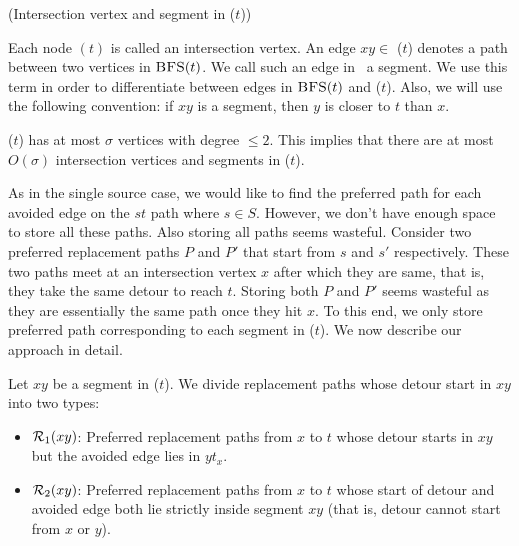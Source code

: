 \begin{definition} (Intersection vertex and segment in \SBFS($t$))

\noindent Each node  \SBFS$(t)$  is called an intersection vertex.
An edge $xy \in$ \SBFS($t$) denotes a path between two vertices in $\textsc{BFS}(t)$.
We call such an edge in \SBFS\  a segment. We use this term in order to differentiate between  edges in $\textsc{BFS}(t)$ and  \SBFS($t$).
Also, we will use the following convention: if $xy$ is a segment,
then $y$ is closer to $t$ than $x$.
\end{definition}
\noindent \SBFS($t$) has at most $\sigma$
vertices with degree $\le 2$. This implies that there are at most $O(\sigma)$
intersection vertices and segments in \SBFS($t$).

As in the single source case, we would like to find the preferred path for each avoided edge on the $st$
path where $s \in S$. However, we don't have enough space to store all these paths.
Also storing all  paths seems wasteful.
Consider two preferred replacement paths $P$ and $P'$ that start from $s$ and $s'$ respectively.
These two paths meet at an intersection vertex $x$ after which they are same, that is, they take
the same detour to reach $t$. Storing both $P$ and $P'$ seems wasteful as they are essentially
the same path once they hit $x$.  To this end, we only store preferred path
corresponding to each segment in \SBFS($t$). We now describe our approach in detail.

Let $xy$ be a segment in \SBFS($t$). We divide replacement paths whose detour start in $xy$ into
two types:
\begin{itemize}[noitemsep,nolistsep]

   \item[] $\mathcal{R}_1(xy)$: Preferred replacement paths from $x$ to $t$ whose detour starts in $xy$
    but the avoided edge lies in $yt_x$.

   \item[] $\mathcal{R}_2(xy)$: Preferred replacement paths from $x$ to $t$ whose
   start of detour and avoided edge both lie strictly inside segment $xy$ (that is, detour cannot
   start from $x$ or $y$).
\end{itemize}


